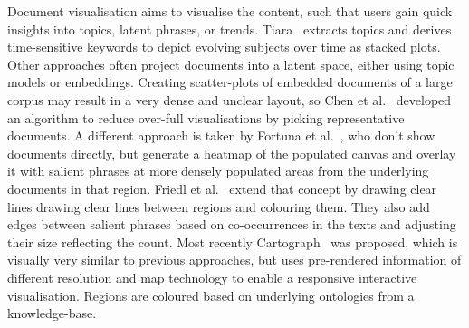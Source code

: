 Document visualisation aims to visualise the content, such that users gain quick insights into topics, latent phrases, or trends.
Tiara~\cite{wei2010tiara} extracts topics and derives time-sensitive keywords to depict evolving subjects over time as stacked plots.
Other approaches often project documents into a latent space, either using topic models or embeddings.
Creating scatter-plots of embedded documents of a large corpus may result in a very dense and unclear layout, so Chen et al.~\cite{chen2009exemplar} developed an algorithm to reduce over-full visualisations by picking representative documents.
A different approach is taken by Fortuna et al.~\cite{fortuna2005visualization}, who don't show documents directly, but generate a heatmap of the populated canvas and overlay it with salient phrases at more densely populated areas from the underlying documents in that region.
Friedl et al.~\cite{fried2014maps} extend that concept by drawing clear lines drawing clear lines between regions and colouring them.
They also add edges between salient phrases based on co-occurrences in the texts and adjusting their size reflecting the count.
Most recently Cartograph~\cite{sen2017cartograph} was proposed, which is visually very similar to previous approaches, but uses pre-rendered information of different resolution and map technology to enable a responsive interactive visualisation. Regions are coloured based on underlying ontologies from a knowledge-base.


% 



